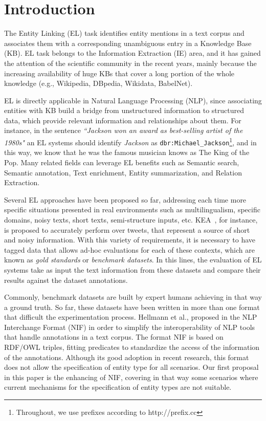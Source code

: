 \documentclass[sigconf]{acmart}
\begin{document}
\section{Introduction}
The Entity Linking (EL) task identifies entity mentions in a text corpus and associates them with a corresponding unambiguous entry in a Knowledge Base (KB). EL task belongs to the Information Extraction (IE) area, and it has gained the attention of the scientific community in the recent years, mainly because the increasing availability of huge KBs that cover a long portion of the whole knowledge (e.g., Wikipedia, DBpedia, Wikidata, BabelNet).

EL is directly applicable in Natural Language Processing (NLP), since associating entities with KB build a bridge from unstructured information to structured data, which provide relevant information and relationships about them. For instance, in the sentence \textit{``Jackson won an award as best-selling artist of the 1980s"} an EL systems should identify \textit{Jackson} as \texttt{dbr:Michael\_Jackson}\footnote{Throughout, we use prefixes according to http://prefix.cc}, and in this way, we know that he was the famous musician knows as The King of the Pop. Many related fields can leverage EL benefits such as Semantic search, Semantic annotation, Text enrichment, Entity summarization, and Relation Extraction. 

Several EL approaches have been proposed so far, addressing each time more specific situations presented in real environments such as multilingualism, specific domains, noisy texts, short texts, semi-structure inputs, etc. KEA~\cite{KEA2016}, for instance, is proposed to accurately perform over tweets, that represent a source of short and noisy information. With this variety of requirements, it is necessary to have tagged data that allows ad-hoc evaluations for each of these contexts, which are known as \textit{gold standards} or \textit{benchmark datasets}. In this lines, the evaluation of EL systems take as input the text information from these datasets and compare their results against the dataset annotations. 

Commonly, benchmark datasets are built by expert humans achieving in that way a ground truth. So far, these datasets have been written in more than one format that difficult the experimentation process. Hellmann et al., proposed in \cite{NIFpaper} the NLP Interchange Format (NIF) in order to simplify the interoperability of NLP tools that handle annotations in a text corpus. The format NIF is based on RDF/OWL triples, fitting predicates to standardize the access of the information of the annotations. Although its good adoption in recent research, this format does not allow the specification of entity type for all scenarios. Our first proposal in this paper is the enhancing of NIF, covering in that way some scenarios where current mechanisms for the specification of entity types are not suitable.
\end{document}
